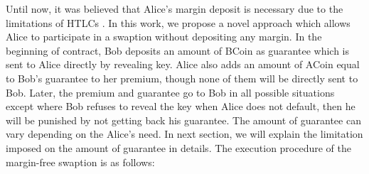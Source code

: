 \label{app:margin-free-swaption}
Until now, it was believed that Alice's margin deposit is necessary due to the limitations of HTLCs \cite{liu2018atomic}. In this work, we propose a novel approach which allows Alice to participate in a swaption without depositing any margin.
In the beginning of contract, Bob deposits an amount of BCoin as guarantee which is sent to Alice directly by revealing \Aone key. Alice also adds an amount of ACoin equal to Bob's guarantee to her premium, though none of them will be directly sent to Bob. Later, the premium and guarantee go to Bob in all possible situations except where Bob refuses to reveal the \keyone key when Alice does not default, then he will be punished by not getting back his guarantee.
The amount of guarantee can vary depending on the Alice's need. In next section, we will explain the limitation imposed on the amount of guarantee in details. The execution procedure of the margin-free swaption is as follows:
